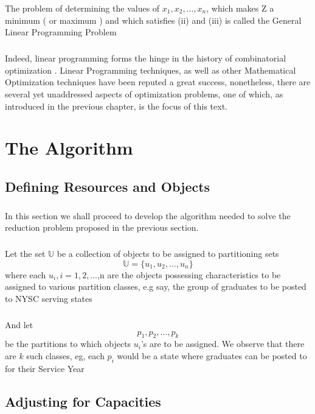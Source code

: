 \documentclass[a4paper,openany]{book}
\begin{document}
			The problem of determining the values of $x_1, x_2,...,x_n$, which makes Z a minimum ( or maximum ) and which satisfies (ii) and (iii) is called the General Linear Programming Problem    
		\paragraph{}
		Indeed, linear programming forms the hinge in the history of combinatorial optimization \cite{schrijver}. Linear Programming techniques, as well as other Mathematical Optimization techniques have been reputed a great success, nonetheless, there are several yet unaddressed aspects of optimization problems, one of which, as introduced in the previous chapter, is the focus of this text.
	\chapter{The Algorithm}
		\section{Defining Resources and Objects}
			\paragraph{}
				In this section we shall proceed to develop the algorithm needed to solve the reduction problem proposed in the previous section.
			\paragraph{}Let the set $\mathbb{U}$ be a collection of objects to be assigned to partitioning sets
				\begin{equation}
					\mathbb{U} = \{u_1, u_2,\dots,u_n\}				
				\end{equation}
				where each $u_i, i=1,2,\dots$,n are the objects possessing characteristics to be assigned to various partition classes, e.g say, the group of graduates to be posted to NYSC serving states
			\paragraph{}And let
			\begin{equation}
				p_1,p_2,\dots,p_k
			\end{equation}
				be the partitions to which objects $u_i$'s are to be assigned. We observe that there are $k$ such classes, eg, each $p_i$ would be a state where graduates can be posted to for their Service Year
		\section{Adjusting for Capacities}
\end{document}
